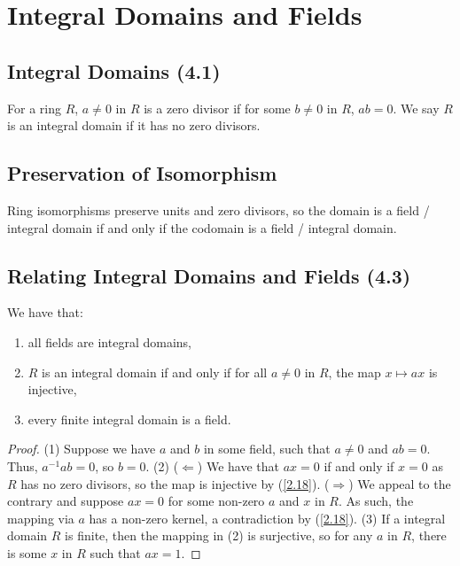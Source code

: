 \section{Integral Domains and Fields}

\subsection{Integral Domains (4.1)} \label{4.1}

For a ring $R$, $a \neq 0$ in $R$ is a zero divisor if for some 
$b \neq 0$ in $R$, $ab = 0$. We say $R$ is an integral domain if it has
no zero divisors.

\subsection{Preservation of Isomorphism}

Ring isomorphisms preserve units and zero divisors, 
so the domain is a field / integral domain if and only 
if the codomain is a field / integral domain.

\subsection{Relating Integral Domains and Fields (4.3)} \label{4.3}

We have that: \begin{enumerate}
    \item all fields are integral domains,
    \item $R$ is an integral domain if and only if for all
        $a \neq 0$ in $R$, the map $x \mapsto ax$ is injective,
    \item every finite integral domain is a field. 
\end{enumerate}

\begin{proof}
    (1) Suppose we have $a$ and $b$ in some field, such that
    $a \neq 0$ and $ab = 0$. Thus, $a^{-1}ab = 0$, so
    $b = 0$. 
    \bs
    (2) ($\Longleftarrow$) We have that $ax = 0$ if and only if
    $x = 0$ as $R$ has no zero divisors, so the map is 
    injective by (\ref{2.18}). \newline
    ($\Longrightarrow$) We appeal to the contrary and suppose
    $ax = 0$ for some non-zero $a$ and $x$ in $R$. As such,
    the mapping via $a$ has a non-zero kernel, a contradiction
    by (\ref{2.18}).
    \bs
    (3) If a integral domain $R$ is finite, then the mapping 
    in (2) is surjective, so for any $a$ in $R$, there is
    some $x$ in $R$ such that $ax = 1$.
\end{proof}

